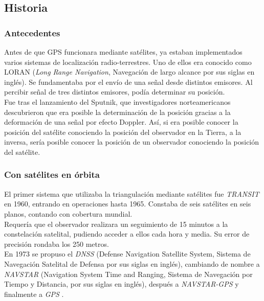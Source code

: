 \subsection{Historia}

\subsubsection{Antecedentes}
Antes de que GPS funcionara mediante satélites, ya estaban implementados varios sistemas de localización radio-terrestres. Uno de ellos era conocido como LORAN (\textit{Long Range Navigation}, Navegación de largo alcance por sus siglas en inglés). Se fundamentaba por el envío de una señal desde distintos emisores. Al percibir señal de tres distintos emisores, podía determinar su posición. \\

Fue tras el lanzamiento del Sputnik\footnotemark, que investigadores norteamericanos descubrieron que era posible la determinación de la posición gracias a la deformación de una señal por efecto Doppler. Así, si era posible conocer la posición del satélite conociendo la posición del observador en la Tierra, a la inversa, sería posible conocer la posición de un observador conociendo la posición del satélite.


\subsubsection{Con satélites en órbita}
El primer sistema que utilizaba la triangulación mediante satélites fue \textit{TRANSIT} en 1960, entrando en operaciones hasta 1965. Constaba de seis satélites en seis planos, contando con cobertura mundial. \\

Requería que el observador realizara un seguimiento de 15 minutos a la constelación satelital, pudiendo acceder a ellos cada hora y media. Su error de precisión rondaba los 250 metros.\\

En 1973 se propuso el \textit{DNSS} (Defense Navigation Satellite System, Sistema de Navegación Satelital de Defensa por sus siglas en inglés), cambiando de nombre a \textit{NAVSTAR} (Navigation System Time and Ranging, Sistema de Navegación por Tiempo y Distancia, por sus siglas en inglés), después a \textit{NAVSTAR-GPS} y finalmente a \textit{GPS} \cite{termal2014prototipo}.

